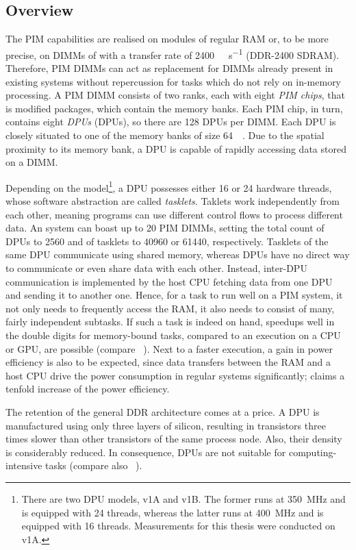 \subsection{Overview}
\label{sec:prereq:arch:overview}

The \ac{PIM} capabilities are realised on modules of regular \ac{RAM} or, to be more precise, on \acp{DIMM} of   with a transfer rate of \qty{2400}{\mega\transfer\per\second} (\acs{DDR}-2400 \acs{SDRAM}).
Therefore, \ac{PIM} \acp{DIMM} can act as replacement for \acp{DIMM} already present in existing systems without repercussion for tasks which do not rely on in-memory processing.
A \ac{PIM} \ac{DIMM} consists of two ranks, each with eight \emph{PIM chips}, that is modified  packages, which contain the memory banks.
Each \ac{PIM} chip, in turn, contains eight \emph{\aclp{DPU}} (\acsp{DPU}), so there are 128 \acp{DPU} per \ac{DIMM}.
Each \ac{DPU} is closely situated to one of the memory banks of size \qty{64}{\mebi\byte}.
Due to the spatial proximity to its memory bank, a \ac{DPU} is capable of rapidly accessing data stored on a \ac{DIMM}.

Depending on the model\footnote{
	There are two \ac{DPU} models, v1A and v1B.
	The former runs at \qty{350}{\mega\hertz} and is equipped with 24 threads, whereas the latter runs at \qty{400}{\mega\hertz} and is equipped with 16 threads.
	Measurements for this thesis were conducted on v1A.
}, a \ac{DPU} possesses either 16 or 24 hardware threads, whose software abstraction are called \emph{tasklets}.
Taklets work independently from each other, meaning programs can use different control flows to process different data.
An \upmem{} system can boast up to 20 \ac{PIM} \acp{DIMM}, setting the total count of \acp{DPU} to \num{2560} and of tasklets to \num{40960} or \num{61440}, respectively.
Tasklets of the same \ac{DPU} communicate using shared memory, whereas \acp{DPU} have no direct way to communicate or even share data with each other.
Instead, inter-\ac{DPU} communication is implemented by the host \ac{CPU} fetching data from one \ac{DPU} and sending it to another one.
Hence, for a task to run well on a \ac{PIM} system, it not only needs to frequently access the \ac{RAM}, it also needs to consist of many, fairly independent subtasks.
If such a task is indeed on hand, speedups well in the double digits for memory-bound tasks, compared to an execution on a \ac{CPU} or \ac{GPU}, are possible (compare \citeauthor{mutlu2022Benchmarking}~\cite{mutlu2022Benchmarking}).
Next to a faster execution, a gain in power efficiency is also to be expected, since data transfers between the \ac{RAM} and a host \ac{CPU} drive the power consumption in regular systems significantly;
\upmem{} claims a tenfold increase of the power efficiency.

The retention of the general \ac{DDR} architecture comes at a price.
A \ac{DPU} is manufactured using only three layers of silicon, resulting in transistors three times slower than other transistors of the same process node.
Also, their density is considerably reduced.
In consequence, \acp{DPU} are not suitable for computing-intensive tasks (compare also \citeauthor{mutlu2022Benchmarking}~\cite{mutlu2022Benchmarking}).
